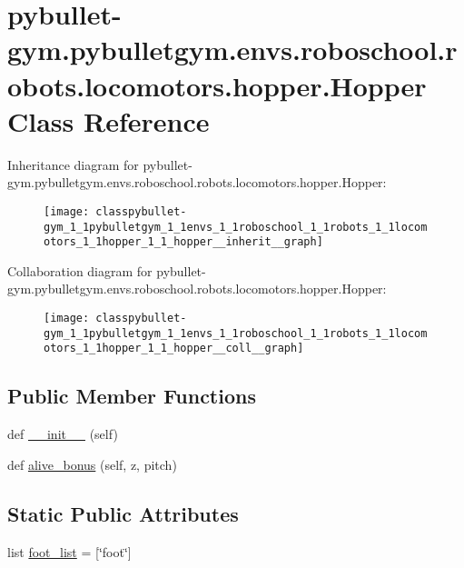 \hypertarget{classpybullet-gym_1_1pybulletgym_1_1envs_1_1roboschool_1_1robots_1_1locomotors_1_1hopper_1_1_hopper}{}\section{pybullet-\/gym.pybulletgym.\+envs.\+roboschool.\+robots.\+locomotors.\+hopper.\+Hopper Class Reference}
\label{classpybullet-gym_1_1pybulletgym_1_1envs_1_1roboschool_1_1robots_1_1locomotors_1_1hopper_1_1_hopper}


Inheritance diagram for pybullet-\/gym.pybulletgym.\+envs.\+roboschool.\+robots.\+locomotors.\+hopper.\+Hopper\+:
\nopagebreak
\begin{figure}[H]
\begin{center}
\leavevmode
\texttt{[image: classpybullet-gym\_1\_1pybulletgym\_1\_1envs\_1\_1roboschool\_1\_1robots\_1\_1locomotors\_1\_1hopper\_1\_1\_hopper\_\_inherit\_\_graph]}
\end{center}
\end{figure}


Collaboration diagram for pybullet-\/gym.pybulletgym.\+envs.\+roboschool.\+robots.\+locomotors.\+hopper.\+Hopper\+:
\nopagebreak
\begin{figure}[H]
\begin{center}
\leavevmode
\texttt{[image: classpybullet-gym\_1\_1pybulletgym\_1\_1envs\_1\_1roboschool\_1\_1robots\_1\_1locomotors\_1\_1hopper\_1\_1\_hopper\_\_coll\_\_graph]}
\end{center}
\end{figure}
\subsection*{Public Member Functions}
\begin{DoxyCompactItemize}
\item 
def \hyperlink{classpybullet-gym_1_1pybulletgym_1_1envs_1_1roboschool_1_1robots_1_1locomotors_1_1hopper_1_1_hopper_a431eec17e48ee77ffe53a127ff032c4e}{\+\_\+\+\_\+init\+\_\+\+\_\+} (self)
\item 
def \hyperlink{classpybullet-gym_1_1pybulletgym_1_1envs_1_1roboschool_1_1robots_1_1locomotors_1_1hopper_1_1_hopper_a5b3cb2684a9380613aa45d303fd6ba8b}{alive\+\_\+bonus} (self, z, pitch)
\end{DoxyCompactItemize}
\subsection*{Static Public Attributes}
\begin{DoxyCompactItemize}
\item 
list \hyperlink{classpybullet-gym_1_1pybulletgym_1_1envs_1_1roboschool_1_1robots_1_1locomotors_1_1hopper_1_1_hopper_aba9ff7a855f3987689e68ce6723cc31c}{foot\+\_\+list} = \mbox{[}\char`\"{}foot\char`\"{}\mbox{]}
\end{DoxyCompactItemize}



